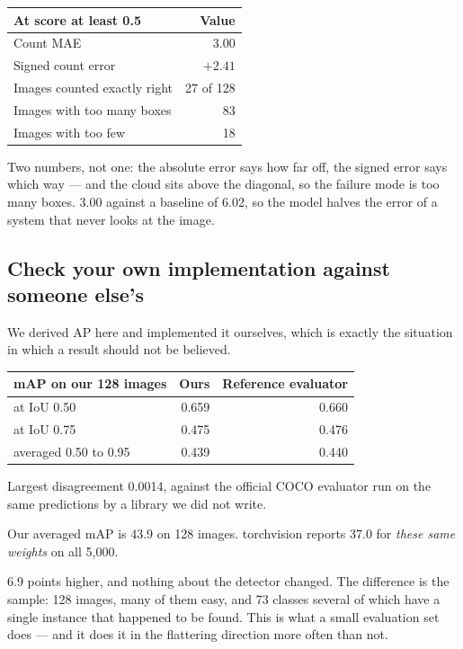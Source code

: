 \documentclass[11pt,a4paper]{article}
\begin{document}
\begin{center}
\small
\begin{tabular}{lr}
\toprule
\textbf{At score at least 0.5} & \textbf{Value} \\
\midrule
Count MAE & 3.00 \\
Signed count error & $+2.41$ \\
Images counted exactly right & 27 of 128 \\
Images with too many boxes & 83 \\
Images with too few & 18 \\
\bottomrule
\end{tabular}
\end{center}

Two numbers, not one: the absolute error says how far off, the signed error
says which way --- and the cloud sits above the diagonal, so the failure mode
is too many boxes. 3.00 against a baseline of 6.02, so the model halves the
error of a system that never looks at the image.

\subsection{Check your own implementation against someone else's}

We derived AP here and implemented it ourselves, which is exactly the situation
in which a result should not be believed.

\begin{center}
\small
\begin{tabular}{lrr}
\toprule
\textbf{mAP on our 128 images} & \textbf{Ours} & \textbf{Reference evaluator} \\
\midrule
at IoU 0.50 & 0.659 & 0.660 \\
at IoU 0.75 & 0.475 & 0.476 \\
averaged 0.50 to 0.95 & 0.439 & 0.440 \\
\bottomrule
\end{tabular}
\end{center}

Largest disagreement 0.0014, against the official COCO evaluator run on the
same predictions by a library we did not write.

\begin{failbox}[title={And now compare 128 images against 5{,}000}]
Our averaged mAP is 43.9 on 128 images. torchvision reports 37.0 for
\emph{these same weights} on all 5{,}000.

6.9 points higher, and nothing about the detector changed. The difference is
the sample: 128 images, many of them easy, and 73 classes several of which have
a single instance that happened to be found. This is what a small evaluation
set does --- and it does it in the flattering direction more often than not.
\end{failbox}
\end{document}
